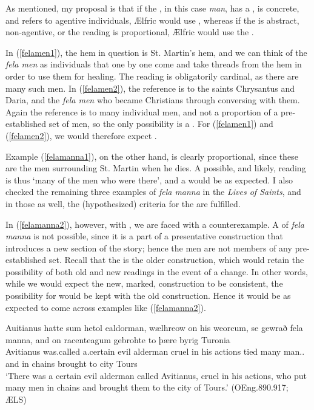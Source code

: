 \documentclass[output=paper,colorlinks,citecolor=brown]{langscibook}
\begin{document}
As mentioned, my proposal is that if the , in this case \textit{man}, has a , is concrete, and refers to agentive individuals, Ælfric would use , whereas if the  is abstract, non-agentive, or the reading is proportional, Ælfric would use the .

In (\ref{felamen1}), the hem in question is St. Martin’s hem, and we can think of the \textit{fela men} as individuals that one by one come and take threads from the hem in order to use them for healing. The reading is obligatorily cardinal, as there are many such men. In (\ref{felamen2}), the reference is to the saints Chrysantus and Daria, and the \textit{fela men} who became Christians through conversing with them. Again the reference is to many individual men, and not a proportion of a pre-established set of men, so the only possibility is a . For (\ref{felamen1}) and (\ref{felamen2}), we would therefore expect .

Example (\ref{felamanna1}), on the other hand, is clearly proportional, since these are the men surrounding St. Martin when he dies. A possible, and likely, reading is thus ‘many of the men who were there’, and a  would be as expected. I also checked the remaining three examples of \textit{fela manna} in the \textit{Lives of Saints}, and in those as well, the (hypothesized) criteria for the  are fulfilled. 

In (\ref{felamanna2}), however, with , we are faced with a counterexample. A  of \textit{fela manna} is not possible, since it is a part of a presentative construction that introduces a new section of the story; hence the men are not members of any pre-established set. Recall that the  is the older construction, which would retain the possibility of both old and new readings in the event of a change. In other words, while we would expect the new, marked, construction to be consistent, the possibility for  would be kept with the old construction. Hence it would be as expected to come across examples like (\ref{felamanna2}).  

\ea\label{felamanna2}
\gll Auitianus hatte sum hetol ealdorman, wælhreow on his weorcum, se gewrað fela manna, and on racenteagum gebrohte to þære byrig Turonia\\
Avitianus was.called a.certain evil alderman cruel in his actions \DEM{} tied many man.\GEN.\PL{} and in chains brought to \DEF{} city Tours\\
\glt ‘There was a certain evil alderman called Avitianus, cruel in his actions, who put many men in chains and brought them to the city of Tours.’ (OEng.890.917; ÆLS)
\z
\end{document}
